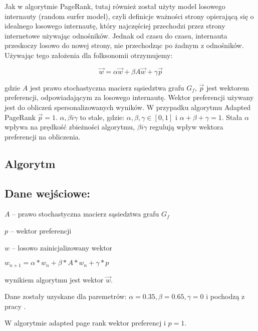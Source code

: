 Jak w algorytmie PageRank, tutaj również został użyty model losowego internauty (random surfer model), czyli definicje ważności strony opierającą się o idealnego losowego internautę, który najczęściej przechodzi przez strony internetowe używając odnośników. Jednak od czasu do czasu, internauta przeskoczy losowo do nowej strony, nie przechodząc po żadnym z odnośników. Używając tego założenia dla folksonomii otrzymujemy:

\begin{equation}
  \vec{w} = \alpha  \vec{w} + \beta A  \vec{w} + \gamma \vec{p}
\end{equation}

gdzie $A$ jest prawo stochastyczna macierz sąsiedztwa grafu $G_f$, $\vec{p}$ jest wektorem preferencji, odpowiadającym za losowego internautę. Wektor preferencji używany jest do obliczeń spersonalizowanych wyników. W przypadku algorytmu Adapted PageRank $\vec{p}=1$. $\alpha, \beta i \gamma$ to stale, gdzie: $\alpha, \beta, \gamma \in [0,1]$ i $\alpha + \beta + \gamma = 1$. Stała  $\alpha$ wpływa na prędkość zbieżności algorytmu, $\beta i \gamma$ regulują wpływ wektora preferencji na obliczenia. 


\subsection{Algorytm}
\subsection*{Dane wejściowe:}
$A$ -- prawo stochastyczna macierz sąsiedztwa grafu $G_f$

$p$ -- wektor preferencji

$w$ -- losowo zainicjalizowany wektor

\begin{center}
\begin{algorithmic}
\REPEAT
\STATE $w_{n+1} = \alpha * w_n + \beta * A * w_n + \gamma * p$

\end{algorithmic}
\end{center}

wynikiem algorytmu jest wektor $\vec{w}$.

Dane zostały uzyskane dla paremetrów: $\alpha = 0.35, \beta = 0.65, \gamma = 0$ i pochodzą z pracy \cite{hotho2006information}.

W algorytmie adapted page rank wektor preferencj i $p = 1$.


